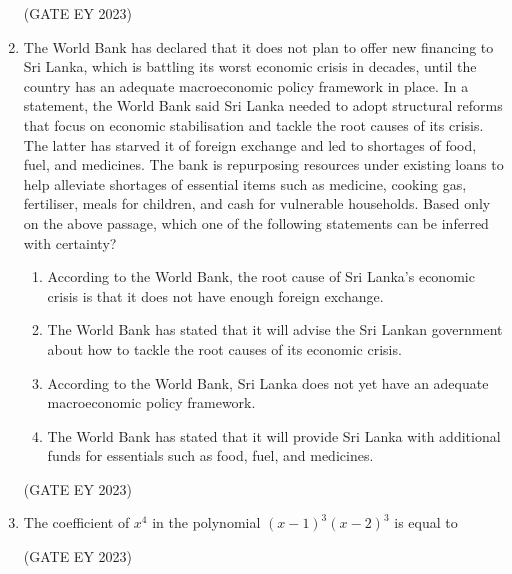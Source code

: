 \documentclass[journal,12pt,onecolumn]{IEEEtran}
\theoremstyle{remark}
\begin{document}
\begin{enumerate}
\begin{enumerate}
\begin{multicols}{4}
\end{multicols}
\end{enumerate}
\hfill{(GATE EY 2023)}

 \item The World Bank has declared that it does not plan to offer new financing to Sri
Lanka, which is battling its worst economic crisis in decades, until the country has
an adequate macroeconomic policy framework in place. In a statement, the World
Bank said Sri Lanka needed to adopt structural reforms that focus on economic
stabilisation and tackle the root causes of its crisis. The latter has starved it of
foreign exchange and led to shortages of food, fuel, and medicines. The bank is
repurposing resources under existing loans to help alleviate shortages of essential
items such as medicine, cooking gas, fertiliser, meals for children, and cash for
vulnerable households.
Based only on the above passage, which one of the following statements can be
inferred with certainty?

\begin{enumerate}

\item According to the World Bank, the root cause of Sri Lanka's economic crisis is that
it does not have enough foreign exchange.
\item The World Bank has stated that it will advise the Sri Lankan government about how
to tackle the root causes of its economic crisis.
\item According to the World Bank, Sri Lanka does not yet have an adequate
macroeconomic policy framework.
\item The World Bank has stated that it will provide Sri Lanka with additional funds for
essentials such as food, fuel, and medicines.


\end{enumerate}
\hfill{(GATE EY 2023)}
 \item The coefficient of $x^4$ in the polynomial $(x-1)^3(x-2)^3$ is equal to \underline{\hspace{1.5cm}}
\begin{enumerate}
\end{enumerate}
\hfill{(GATE EY 2023)}



\end{enumerate}
\end{document}
